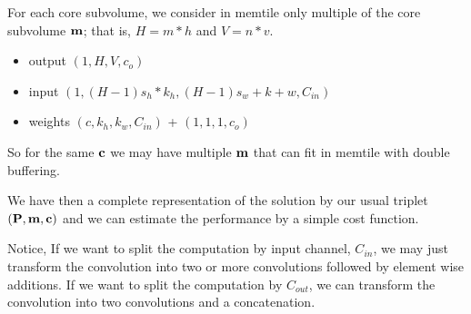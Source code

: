 \documentclass[conference]{IEEEtran}
\begin{document}
For each core subvolume, we consider in memtile only multiple of the
core subvolume ${\bf m}$; that is, $H = m*h$ and $V=n*v$.
\begin{itemize}
  \item output $(1,H,V,c_o)$ 
  \item input  $(1,(H-1)s_h*k_h,(H-1)s_w+k+w,C_{in})$ 
  \item weights $(c,k_h,k_w,C_{in})$ + $(1,1,1,c_o)$ 
\end{itemize}



So for the same ${\bf c}$ we may have
multiple ${\bf m}$ that can fit in memtile with double buffering.

We have then a complete representation of the solution by our usual
triplet $({\bf P, m ,c})$ and we can estimate the performance by a
simple cost function. 

Notice, If we want to split the computation by input channel,
$C_{in}$, we may just transform the convolution into two or more
convolutions followed by element wise additions. If we want to split
the computation by $C_{out}$, we can transform the convolution into
two convolutions and a concatenation.

























 

%
\end{document}

